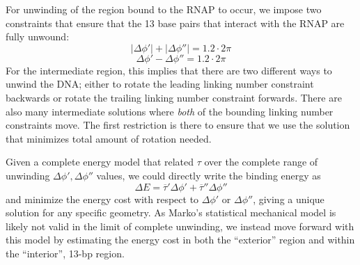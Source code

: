 \documentclass[11pt]{article}
\begin{document}
For unwinding of the region bound to the RNAP to occur, we impose two constraints that ensure that the 13 base pairs that interact with the RNAP are fully unwound:
\begin{equation}
    |\Delta \phi'| + |\Delta \phi''| = 1.2 \cdot 2 \pi
\end{equation}
\begin{equation}
    \Delta \phi' - \Delta \phi'' = 1.2 \cdot 2\pi \label{eq:dphi_relation}
\end{equation}
For the intermediate region, this implies that there are two different ways to unwind the DNA; either to rotate the leading linking number constraint backwards or rotate the trailing linking number constraint forwards. There are also many intermediate solutions where \emph{both} of the bounding linking number constraints move. The first restriction is there to ensure that we use the solution that minimizes total amount of rotation needed.

Given a complete energy model that related \(\tau\) over the complete range of unwinding \(\Delta \phi', \Delta \phi''\) values, we could directly write the binding energy as
\begin{equation}
    \Delta E = \overline \tau' \Delta \phi' + \overline \tau'' \Delta \phi''
    \label{eq:direct_torque_calc}
\end{equation}
and minimize the energy cost with respect to \(\Delta \phi'\) or \(\Delta \phi''\), giving a unique solution for any specific geometry. As Marko's statistical mechanical model is likely not valid in the limit of complete unwinding, we instead move forward with this model by estimating the energy cost in both the ``exterior'' region and within the ``interior'', 13-bp region.
\end{document}
